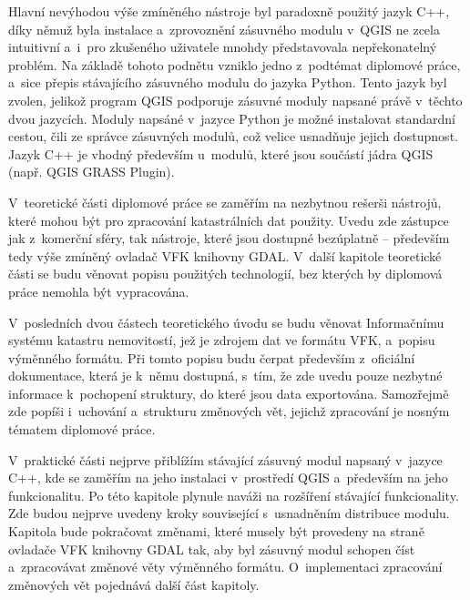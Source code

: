 \documentclass[a4paper,12pt,oneside]{book}
\begin{document}
Hlavní nevýhodou výše zmíněného nástroje byl paradoxně použitý jazyk C++,
díky němuž byla instalace a~zprovoznění zásuvného modulu v~QGIS ne
zcela intuitivní a~i~pro zkušeného uživatele mnohdy představovala
nepřekonatelný problém. Na základě tohoto podnětu vzniklo jedno
z~podtémat diplomové práce, a~sice přepis stávajícího zásuvného
modulu do jazyka Python. Tento jazyk byl zvolen, jelikož program QGIS
podporuje zásuvné moduly napsané právě v~těchto dvou jazycích. 
Moduly napsáné v~jazyce Python je možné instalovat standardní cestou, 
čili ze správce zásuvných modulů, což velice usnadňuje jejich dostupnost.
Jazyk C++ je vhodný především u~modulů, které jsou součástí jádra QGIS
(např. QGIS GRASS Plugin).

V~teoretické části diplomové práce se zaměřím na nezbytnou rešerši
nástrojů, které mohou být pro zpracování katastrálních dat použity. 
Uvedu zde zástupce jak z~komerční sféry, tak nástroje, které
jsou dostupné bezúplatně -- především tedy výše zmíněný ovladač VFK
knihovny GDAL. V~další kapitole teoretické části se budu věnovat
popisu použitých technologií, bez kterých by diplomová práce nemohla
být vypracována.

V~posledních dvou částech teoretického úvodu se budu věnovat
Informačnímu systému katastru nemovitostí, jež je zdrojem dat ve
formátu VFK, a~popisu výměnného formátu. Při tomto popisu budu
čerpat především z~oficiální dokumentace, která je k~němu dostupná,
s~tím, že zde uvedu pouze nezbytné informace k~pochopení struktury, do
které jsou data exportována. Samozřejmě zde popíši i~uchování
a~strukturu změnových vět, jejichž zpracování je nosným tématem
diplomové práce.

V~praktické části nejprve přiblížím stávající zásuvný modul napsaný
v~jazyce C++, kde se zaměřím na jeho instalaci v~prostředí QGIS
a~především na jeho funkcionalitu. Po této kapitole plynule naváži na
rozšíření stávající funkcionality. Zde budou nejprve uvedeny kroky
související s~usnadněním distribuce modulu. Kapitola bude pokračovat
změnami, které musely být provedeny na straně ovladače VFK knihovny
GDAL tak, aby byl zásuvný modul schopen číst a~zpracovávat změnové
věty výměnného formátu. O~implementaci zpracování změnových vět
pojednává dal\-ší část kapitoly. 
\end{document}
